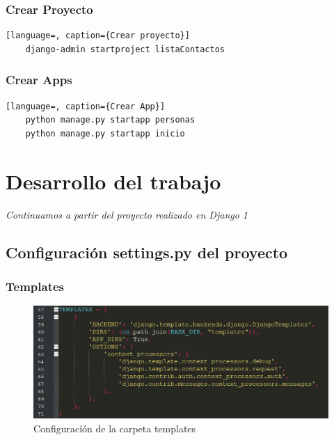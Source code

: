 \documentclass{article}
\begin{document}

  \subsubsection{Crear Proyecto}
  \begin{lstlisting}[language=, caption={Crear proyecto}]
    django-admin startproject listaContactos
  \end{lstlisting}
  

  \subsubsection{Crear Apps}
  \begin{lstlisting}[language=, caption={Crear App}]
    python manage.py startapp personas
    python manage.py startapp inicio
  \end{lstlisting}
  

  \section{Desarrollo del trabajo}
  \textit{Continuamos a partir del proyecto realizado en Django 1}
  

  \subsection{Configuración settings.py del proyecto}
  

  \subsubsection{Templates}
  \begin{figure}[H]
    \centering
    \includegraphics[width=1\textwidth, keepaspectratio]{img/templates.png}  
    \caption{Configuración de la carpeta templates}
  \end{figure}
  
\end{document}
